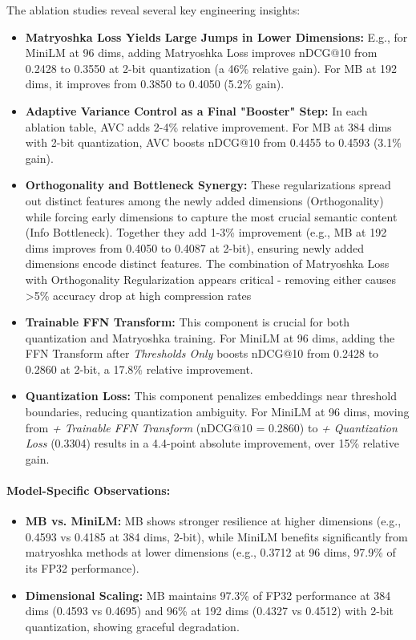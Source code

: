 The ablation studies reveal several key engineering insights:
\begin{itemize}
    \item \textbf{Matryoshka Loss Yields Large Jumps in Lower Dimensions:} E.g., for MiniLM at 96 dims, adding Matryoshka Loss improves nDCG@10 from 0.2428 to 0.3550 at 2-bit quantization (a 46\% relative gain). For MB at 192 dims, it improves from 0.3850 to 0.4050 (5.2\% gain).
    \item \textbf{Adaptive Variance Control as a Final "Booster" Step:} In each ablation table, AVC adds 2-4\% relative improvement. For MB at 384 dims with 2-bit quantization, AVC boosts nDCG@10 from 0.4455 to 0.4593 (3.1\% gain).
    \item \textbf{Orthogonality and Bottleneck Synergy:} These regularizations spread out distinct features among the newly added dimensions (Orthogonality) while forcing early dimensions to capture the most crucial semantic content (Info Bottleneck). 
    Together they add 1-3\% improvement (e.g., MB at 192 dims improves from 0.4050 to 0.4087 at 2-bit), ensuring newly added dimensions encode distinct features.
    The combination of Matryoshka Loss with Orthogonality Regularization appears critical - removing either causes >5\% accuracy drop at high compression rates
    \item \textbf{Trainable FFN Transform:} This component is crucial for both quantization and Matryoshka training. For MiniLM at 96 dims, adding the FFN Transform after \textit{Thresholds Only} boosts nDCG@10 from 0.2428 to 0.2860 at 2-bit, a 17.8\% relative improvement.
    \item \textbf{Quantization Loss:} This component penalizes embeddings near threshold boundaries, reducing quantization ambiguity. For MiniLM at 96 dims, moving from \textit{+ Trainable FFN Transform} (nDCG@10 = 0.2860) to \textit{+ Quantization Loss} (0.3304) results in a 4.4-point absolute improvement, over 15\% relative gain.
\end{itemize}

\paragraph{Model-Specific Observations:}
\begin{itemize}
    \item \textbf{MB vs. MiniLM:} MB shows stronger resilience at higher dimensions (e.g., 0.4593 vs 0.4185 at 384 dims, 2-bit), while MiniLM benefits significantly from matryoshka methods at lower dimensions (e.g., 0.3712 at 96 dims, 97.9\% of its FP32 performance).
    \item \textbf{Dimensional Scaling:} MB maintains 97.3\% of FP32 performance at 384 dims (0.4593 vs 0.4695) and 96\% at 192 dims (0.4327 vs 0.4512) with 2-bit quantization, showing graceful degradation.
\end{itemize}

